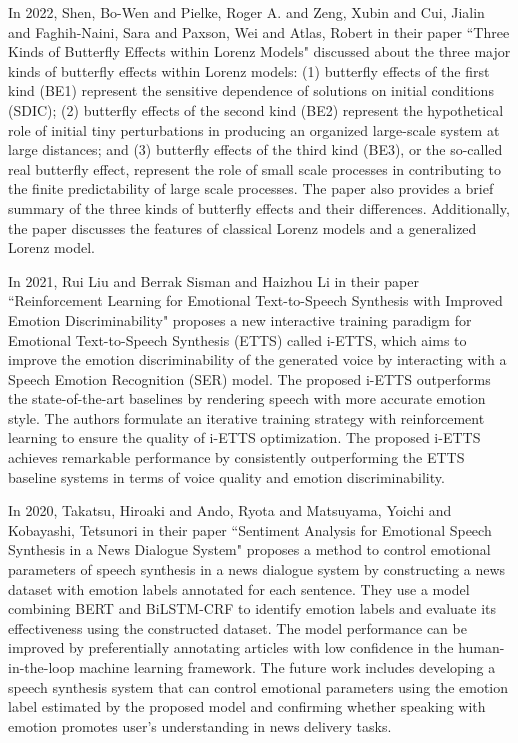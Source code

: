 In 2022, Shen, Bo-Wen and Pielke, Roger A. and Zeng, Xubin and Cui, Jialin and Faghih-Naini, Sara and Paxson, Wei and Atlas, Robert in their paper ``Three Kinds of Butterfly Effects within Lorenz Models" discussed about the three major kinds of butterfly effects within Lorenz models: (1) butterfly effects of the first kind (BE1) represent the sensitive dependence of solutions on initial conditions (SDIC); (2) butterfly effects of the second kind (BE2) represent the hypothetical role of initial tiny perturbations in producing an organized large-scale system at large distances; and (3) butterfly effects of the third kind (BE3), or the so-called real butterfly effect, represent the role of small scale processes in contributing to the finite predictability of large scale processes. The paper also provides a brief summary of the three kinds of butterfly effects and their differences. Additionally, the paper discusses the features of classical Lorenz models and a generalized Lorenz model\cite{encyclopedia2030084}.
\vspace{1\baselineskip}

In 2021, Rui Liu and Berrak Sisman and Haizhou Li in their paper ``Reinforcement Learning for Emotional Text-to-Speech Synthesis with Improved Emotion Discriminability" proposes a new interactive training paradigm for Emotional Text-to-Speech Synthesis (ETTS) called i-ETTS, which aims to improve the emotion discriminability of the generated voice by interacting with a Speech Emotion Recognition (SER) model. The proposed i-ETTS outperforms the state-of-the-art baselines by rendering speech with more accurate emotion style. The authors formulate an iterative training strategy with reinforcement learning to ensure the quality of i-ETTS optimization. The proposed i-ETTS achieves remarkable performance by consistently outperforming the ETTS baseline systems in terms of voice quality and emotion discriminability\cite{liu21p_interspeech}.
\vspace{1\baselineskip}

In 2020, Takatsu, Hiroaki  and Ando, Ryota and Matsuyama, Yoichi  and Kobayashi, Tetsunori in their paper ``Sentiment Analysis for Emotional Speech Synthesis in a News Dialogue System" proposes a method to control emotional parameters of speech synthesis in a news dialogue system by constructing a news dataset with emotion labels annotated for each sentence. They use a model combining BERT and BiLSTM-CRF to identify emotion labels and evaluate its effectiveness using the constructed dataset. The model performance can be improved by preferentially annotating articles with low confidence in the human-in-the-loop machine learning framework. The future work includes developing a speech synthesis system that can control emotional parameters using the emotion label estimated by the proposed model and confirming whether speaking with emotion promotes user's understanding in news delivery tasks\cite{takatsu-etal-2020-sentiment}.
\vspace{1\baselineskip}

